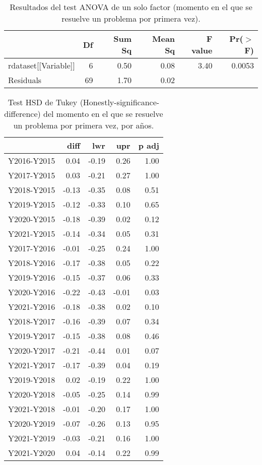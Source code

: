 \begin{table}[H]
\centering
\caption{Resultados del test ANOVA de un solo factor (momento en el que se resuelve un problema por primera vez).}
\label{tab:ANOVAearlybird}
\begin{tabular}{lrrrrr}
  \hline
 & Df & Sum Sq & Mean Sq & F value & Pr($>$F) \\ 
  \hline
rdataset[[Variable]] & 6 & 0.50 & 0.08 & 3.40 & 0.0053 \\ 
  Residuals            & 69 & 1.70 & 0.02 &  &  \\ 
   \hline
\end{tabular}
\end{table}

\begin{table}[H]
\centering
\caption{Test HSD de Tukey (Honestly-significance-difference) del momento en el que se resuelve un problema por primera vez, por años.}
\label{tab:Tukeyearlybird}
\begin{tabular}{rrrrr}
  \hline
 & diff & lwr & upr & p adj \\ 
  \hline
Y2016-Y2015 & 0.04 & -0.19 & 0.26 & 1.00 \\ 
  Y2017-Y2015 & 0.03 & -0.21 & 0.27 & 1.00 \\ 
  Y2018-Y2015 & -0.13 & -0.35 & 0.08 & 0.51 \\ 
  Y2019-Y2015 & -0.12 & -0.33 & 0.10 & 0.65 \\ 
  Y2020-Y2015 & -0.18 & -0.39 & 0.02 & 0.12 \\ 
  Y2021-Y2015 & -0.14 & -0.34 & 0.05 & 0.31 \\ 
  Y2017-Y2016 & -0.01 & -0.25 & 0.24 & 1.00 \\ 
  Y2018-Y2016 & -0.17 & -0.38 & 0.05 & 0.22 \\ 
  Y2019-Y2016 & -0.15 & -0.37 & 0.06 & 0.33 \\ 
  Y2020-Y2016 & -0.22 & -0.43 & -0.01 & 0.03 \\ 
  Y2021-Y2016 & -0.18 & -0.38 & 0.02 & 0.10 \\ 
  Y2018-Y2017 & -0.16 & -0.39 & 0.07 & 0.34 \\ 
  Y2019-Y2017 & -0.15 & -0.38 & 0.08 & 0.46 \\ 
  Y2020-Y2017 & -0.21 & -0.44 & 0.01 & 0.07 \\ 
  Y2021-Y2017 & -0.17 & -0.39 & 0.04 & 0.19 \\ 
  Y2019-Y2018 & 0.02 & -0.19 & 0.22 & 1.00 \\ 
  Y2020-Y2018 & -0.05 & -0.25 & 0.14 & 0.99 \\ 
  Y2021-Y2018 & -0.01 & -0.20 & 0.17 & 1.00 \\ 
  Y2020-Y2019 & -0.07 & -0.26 & 0.13 & 0.95 \\ 
  Y2021-Y2019 & -0.03 & -0.21 & 0.16 & 1.00 \\ 
  Y2021-Y2020 & 0.04 & -0.14 & 0.22 & 0.99 \\ 
   \hline
\end{tabular}
\end{table}

